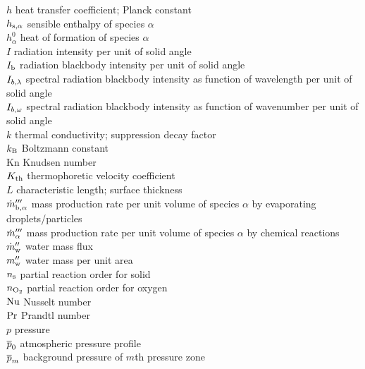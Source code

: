 \begin{tabbing}
$h$                       \> heat transfer coefficient; Planck constant      \\
$h_{\rm s,\alpha}$                \> sensible enthalpy of species $\alpha$   \\
$h_\alpha^0$              \> heat of formation of species $\alpha$           \\
$I$                       \> radiation intensity per unit of solid angle     \\
$I_{\rm b}$               \> radiation blackbody intensity per unit of solid angle  \\
$I_{b,\rm \lambda}$           \> spectral radiation blackbody intensity as function of wavelength per unit of solid angle  \\
$I_{b,\rm \omega}$           \> spectral radiation blackbody intensity as function of wavenumber per unit of solid angle  \\
$k$                       \> thermal conductivity; suppression decay factor \\
$k_{\rm B}$               \> Boltzmann constant                             \\
Kn                        \> Knudsen number \\
$K_{\rm th}$              \> thermophoretic velocity coefficient \\
$L$                       \> characteristic length; surface thickness \\
$\dot{m}_{{\rm b},\alpha}'''$ \> mass production rate per unit volume of species $\alpha$ by evaporating droplets/particles \\
$\dot{m}_\alpha'''$           \> mass production rate per unit volume of species $\alpha$ by chemical reactions \\
$\dot{m}_{\rm w}''$           \> water mass flux  \\
$m_{\rm w}''$             \> water mass per unit area \\
$n_{\rm s}$               \> partial reaction order for solid \\
$n_{\rm O_2}$             \> partial reaction order for oxygen \\
$\hbox{Nu}$                     \> Nusselt number \\
$\hbox{Pr}$                     \> Prandtl number \\
$p$                       \> pressure \\
$\overline{p}_0$                   \> atmospheric pressure profile \\
$\overline{p}_m$                   \> background pressure of $m$th pressure zone \\

\end{tabbing}
